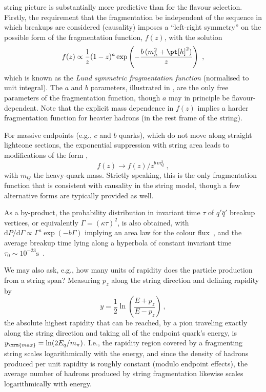string picture is substantially more predictive than for the flavour
selection. Firstly, the requirement  that the
fragmentation be independent of the sequence in which breakups are
considered (causality) imposes a ``left-right symmetry'' on the
possible form of the fragmentation function, $f(z)$, 
with the solution~\cite{Andersson:1983jt}
\begin{equation}
f(z) \propto \frac{1}{z} (1-z)^a \exp\left(-\frac{b\,(m_h^2 +
  \pt[h]^2)}{z}\right)~, \label{eq:lund-symm}
\end{equation}
which is known as the \emph{Lund symmetric fragmentation function}
(normalised to unit integral). 
The $a$ and $b$ parameters, illustrated in , 
are the only free
parameters of the fragmentation function, though $a$ may in principle
be flavour-dependent. Note that the explicit mass dependence in $f(z)$ 
implies a harder fragmentation function for heavier hadrons (in the
rest frame of the string). 

%
For massive endpoints (e.g., $c$ and $b$ quarks), which do not
move along straight lightcone sections, the exponential suppression
with string area leads to modifications of the form
\cite{Bowler:1981sb}, 
\begin{equation}
f(z) \to f(z)/z^{b\,m_Q^2}~, 
\end{equation}
with $m_Q$  the heavy-quark mass. Strictly speaking, this is 
the only fragmentation function that is consistent with causality in
the string model, though a few alternative forms are typically
provided as well. 

As a by-product, the probability distribution in invariant time $\tau$
of $q'\bar{q}'$ breakup vertices, or equivalently $\Gamma = (\kappa
\tau)^2$, is also obtained, with $\mathrm{d}P/\mathrm{d}\Gamma \propto
\Gamma^a \exp(-b\Gamma)$ 
%
implying an area law for the colour
flux~\cite{Wilson:1974sk}, and
the average breakup time lying along a 
hyperbola of constant invariant time $\tau_0 \sim
10^{-23}\mathrm{s}$~\cite{Andersson:1998tv}. 

We may also ask, e.g., how many units of rapidity does the particle
production from a string span? Measuring $p_z$ along the string
direction and defining rapidity by 
\begin{equation}
y = \frac12\ln\left(\frac{E+p_z}{E-p_z}\right)~,
\end{equation}
the absolute highest rapidity that can be reached, by a pion traveling
exactly along the string direction and taking all of the endpoint
quark's energy, is $y_\mrm{max} = \ln(2E_q/m_\pi)$. I.e., 
the rapidity region covered by a fragmenting string scales
logarithmically with the energy, and since the density of hadrons
produced per unit rapidity is roughly constant (modulo endpoint
effects), the average number of hadrons produced by string fragmentation
likewise scales logarithmically with energy.

